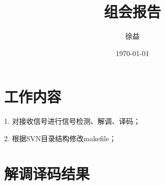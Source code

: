 \documentclass{article}
\title{组会报告}
\author{徐益}
\date{\today}
\begin{document}
\maketitle


\section{工作内容}
1. 对接收信号进行信号检测、解调、译码；

2. 根据SVN目录结构修改makefile；

\section{解调译码结果}
\end{document}
